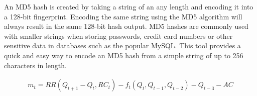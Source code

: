 An MD5 hash is created by taking a string of an any length and encoding it into a 128-bit fingerprint. Encoding the same string using the MD5 algorithm will always result in the same 128-bit hash output. MD5 hashes are commonly used with smaller strings when storing passwords, credit card numbers or other sensitive data in databases such as the popular MySQL. This tool provides a quick and easy way to encode an MD5 hash from a simple string of up to 256 characters in length.

\newpage


\begin{align*}
    m_t = RR \left( Q_{t+1} - Q_t , RC_t\right) - f_t \left( Q_t, Q_{t-1}, Q_{t-2} \right) - Q_{t-3} - AC
\end{align*}

